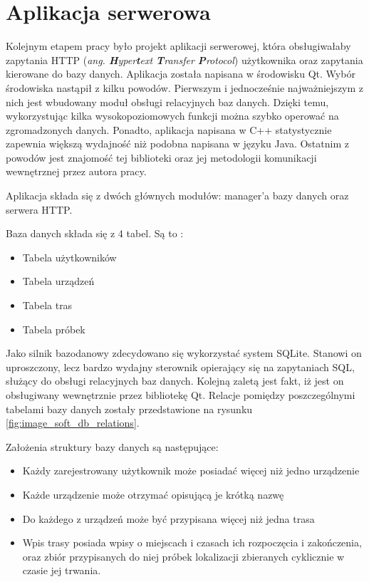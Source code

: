 \section{Aplikacja serwerowa}

Kolejnym etapem pracy było projekt aplikacji serwerowej, która obsługiwałaby zapytania HTTP (\textit{ang. \textbf{H}yper\textbf{t}ext \textbf{T}ransfer \textbf{P}rotocol}) użytkownika oraz zapytania kierowane do bazy danych. Aplikacja została napisana w środowisku Qt. Wybór środowiska nastąpił z kilku powodów. Pierwszym i jednocześnie najważniejszym z nich jest wbudowany moduł obsługi relacyjnych baz danych. Dzięki temu, wykorzystując kilka wysokopoziomowych funkcji można szybko operować na zgromadzonych danych. Ponadto, aplikacja napisana w C++ statystycznie zapewnia większą wydajność niż podobna napisana w języku Java. Ostatnim z powodów jest znajomość tej biblioteki oraz jej metodologii komunikacji wewnętrznej przez autora pracy.

Aplikacja składa się z dwóch głównych modułów: manager'a bazy danych oraz serwera HTTP.

Baza danych składa się z 4 tabel. Są to :

\begin{itemize}
\item Tabela użytkowników
\item Tabela urządzeń
\item Tabela tras
\item Tabela próbek
\end{itemize}

Jako silnik bazodanowy zdecydowano się wykorzystać system SQLite. Stanowi on uproszczony, lecz bardzo wydajny sterownik opierający się na zapytaniach SQL, służący do obsługi relacyjnych baz danych. Kolejną zaletą jest fakt, iż jest on obsługiwany wewnętrznie przez bibliotekę Qt.
Relacje pomiędzy poszczególnymi tabelami bazy danych zostały przedstawione na rysunku \ref{fig:image_soft_db_relations}.

Założenia struktury bazy danych są następujące:

\begin{itemize}
\item Każdy zarejestrowany użytkownik może posiadać więcej niż jedno urządzenie
\item Każde urządzenie może otrzymać opisującą je krótką nazwę
\item Do każdego z urządzeń może być przypisana więcej niż jedna trasa
\item Wpis trasy posiada wpisy o miejscach i czasach ich rozpoczęcia i zakończenia, oraz zbiór przypisanych do niej próbek lokalizacji zbieranych cyklicznie w czasie jej trwania.
\end{itemize}

